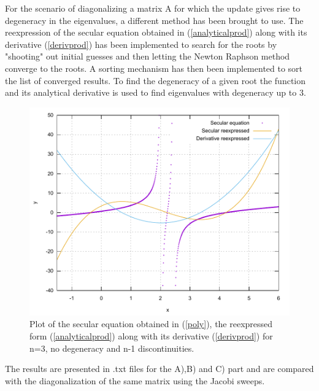 \documentclass{article}
\begin{document}
For the scenario of diagonalizing a matrix A for which the update gives rise to degeneracy in the eigenvalues, a different method has been brought to use. The reexpression of the secular equation obtained in (\ref{analyticalprod}) along with its derivative (\ref*{derivprod}) has been implemented to search for the roots by "shooting" out initial guesses and then letting the Newton Raphson method converge to the roots. A sorting mechanism has then been implemented to sort the list of converged results. To find the degeneracy of a given root the function and its analytical derivative is used to find eigenvalues with degeneracy up to 3.
\begin{figure}[h]
	\centering
	\includegraphics[width=0.9\linewidth]{Functions}
	\caption{Plot of the secular equation obtained in (\ref{poly}), the reexpressed form (\ref{analyticalprod}) along with its derivative (\ref{derivprod}) for n=3, no degeneracy and n-1 discontinuities.} 
	\label{fig:functions}
\end{figure}


The results are presented in .txt files for the A),B) and C) part and are compared with the diagonalization of the same matrix using the Jacobi sweeps.
\end{document}
